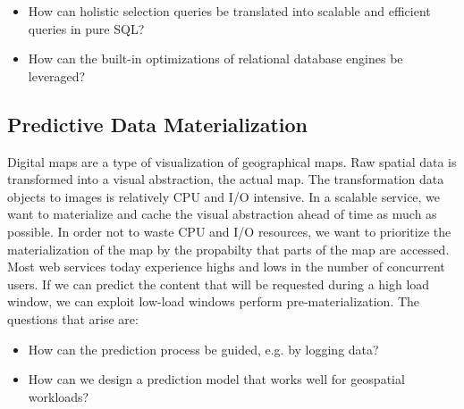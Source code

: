 \begin{itemize}
\item How can holistic selection queries be translated into scalable and efficient queries in pure SQL? 
\item How can the built-in optimizations of relational database engines be leveraged?
\end{itemize}

\subsection{Predictive Data Materialization}


Digital maps are a type of visualization of geographical maps. Raw spatial data is transformed into a visual abstraction, the actual map. The transformation data objects to images is relatively CPU and I/O intensive. In a scalable service, we want to materialize and cache the visual abstraction ahead of time as much as possible. In order not to waste CPU and I/O resources, we want to prioritize the materialization of the map by the propabilty that parts of the map are accessed. Most web services today experience highs and lows in the number of concurrent users. If we can predict the content that will be requested during a high load window, we can exploit low-load windows perform pre-materialization. The questions that arise are:
\begin{itemize}
\item How can the prediction process be guided, e.g. by logging data?
\item How can we design a prediction model that works well for geospatial workloads?
\end{itemize}
